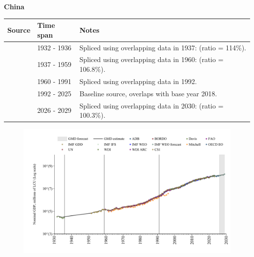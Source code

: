 \documentclass[12pt,a4paper,landscape]{article}
\begin{document}
\begin{adjustbox}{max totalsize={\paperwidth}{\paperheight},center}
\begin{minipage}[t][\textheight][t]{\textwidth}
\vspace*{0.5cm}
{}
\begin{center}
{\Large\bfseries China}
\end{center}
\vspace{0.5cm}
\begin{table}[H]
\centering
\small
\begin{tabular}{|l|l|l|}
\hline
\textbf{Source} & \textbf{Time span} & \textbf{Notes} \\
\hline
\rowcolor{white}\cite{Davis}& 1932 - 1936 &Spliced using overlapping data in 1937: (ratio = 114\%).\\
\rowcolor{lightgray}\cite{IMF_GDD}& 1937 - 1959 &Spliced using overlapping data in 1960: (ratio = 106.8\%).\\
\rowcolor{white}\cite{WDI}& 1960 - 1991 &Spliced using overlapping data in 1992.\\
\rowcolor{lightgray}\cite{OECD_EO}& 1992 - 2025 &Baseline source, overlaps with base year 2018.\\
\rowcolor{white}\cite{IMF_WEO_forecast}& 2026 - 2029 &Spliced using overlapping data in 2030: (ratio = 100.3\%).\\
\hline
\end{tabular}
\end{table}
\begin{figure}[H]
\centering
\includegraphics[width=\textwidth,height=0.6\textheight,keepaspectratio]{graphs/CHN_nGDP.pdf}
\end{figure}
\end{minipage}
\end{adjustbox}
\end{document}
